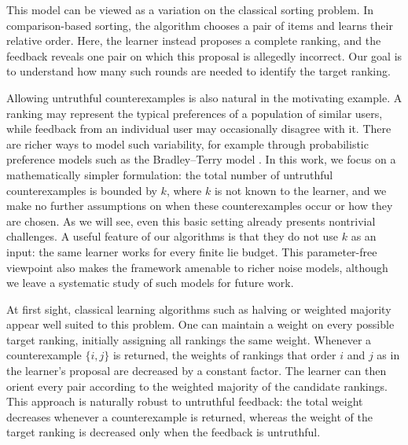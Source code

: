 \documentclass[11pt]{article}
\theoremstyle{definition}
\theoremstyle{remark}
\begin{document}
This model can be viewed as a variation on the classical sorting problem. In
comparison-based sorting, the algorithm chooses a pair of items and learns
their relative order. Here, the learner instead proposes a complete ranking,
and the feedback reveals one pair on which this proposal is allegedly
incorrect. Our goal is to understand how many such rounds are needed to
identify the target ranking.

Allowing untruthful counterexamples is also natural in the motivating
example. A ranking may represent the typical preferences of a population of
similar users, while feedback from an individual user may occasionally
disagree with it. There are richer ways to model such variability, for
example through probabilistic preference models such as the
Bradley--Terry model \cite{BradleyTerry1952}. In this work, we focus on a
mathematically simpler formulation: the total number of untruthful
counterexamples is bounded by $k$, where $k$ is not known to the learner,
and we make no further assumptions on when these counterexamples occur or
how they are chosen. As we will see, even this basic setting already
presents nontrivial challenges. 
A useful feature of our algorithms is that they do not use $k$ as an input:
the same learner works for every finite lie budget. This parameter-free
viewpoint also makes the framework amenable to richer noise models, although
we leave a systematic study of such models for future work.


\medskip

At first sight, classical learning algorithms such as halving or weighted
majority appear well suited to this problem. One can maintain a weight on
every possible target ranking, initially assigning all rankings the same
weight. Whenever a counterexample $\{i,j\}$ is returned, the weights of
rankings that order $i$ and $j$ as in the learner's proposal are decreased
by a constant factor. The learner can then orient every pair according to the
weighted majority of the candidate rankings. This approach is naturally
robust to untruthful feedback: the total weight decreases whenever a
counterexample is returned, whereas the weight of the target ranking is
decreased only when the feedback is untruthful.
\end{document}
